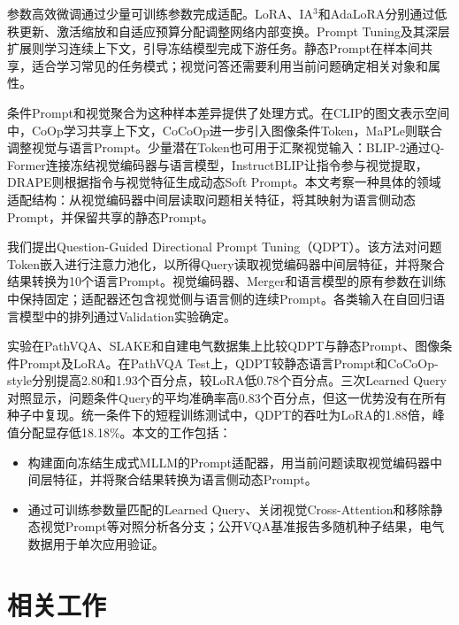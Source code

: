 \documentclass[pdflatex,sn-mathphys-num]{sn-jnl}
\begin{document}
参数高效微调通过少量可训练参数完成适配。LoRA、IA$^3$和AdaLoRA分别通过低秩更新、激活缩放和自适应预算分配调整网络内部变换\cite{Hu2022LoRA,Liu2022FewShotPF,Zhang2023AdaLoRAAB}。Prompt Tuning及其深层扩展则学习连续上下文，引导冻结模型完成下游任务\cite{li2021prefix,lester2021power,Liu2021PTuningVP,jia2022visual}。静态Prompt在样本间共享，适合学习常见的任务模式；视觉问答还需要利用当前问题确定相关对象和属性\cite{dai2023instructblip}。

条件Prompt和视觉聚合为这种样本差异提供了处理方式。在CLIP的图文表示空间中，CoOp学习共享上下文，CoCoOp进一步引入图像条件Token，MaPLe则联合调整视觉与语言Prompt\cite{Radford2021LearningTV,Zhou2021LearningTP,Zhou2022ConditionalPL,Khattak2022MaPLeMP}。少量潜在Token也可用于汇聚视觉输入\cite{Jaegle2021PerceiverGP,Ryoo2021TokenLearnerWC}：BLIP-2通过Q-Former连接冻结视觉编码器与语言模型，InstructBLIP让指令参与视觉提取，DRAPE则根据指令与视觉特征生成动态Soft Prompt\cite{li2023blip,dai2023instructblip,Hu2026DynamicCP}。本文考察一种具体的领域适配结构：从视觉编码器中间层读取问题相关特征，将其映射为语言侧动态Prompt，并保留共享的静态Prompt。

我们提出Question-Guided Directional Prompt Tuning（QDPT）。该方法对问题Token嵌入进行注意力池化，以所得Query读取视觉编码器中间层特征，并将聚合结果转换为10个语言Prompt。视觉编码器、Merger和语言模型的原有参数在训练中保持固定；适配器还包含视觉侧与语言侧的连续Prompt。各类输入在自回归语言模型中的排列通过Validation实验确定。

实验在PathVQA、SLAKE和自建电气数据集上比较QDPT与静态Prompt、图像条件Prompt及LoRA。在PathVQA Test上，QDPT较静态语言Prompt和CoCoOp-style分别提高2.80和1.93个百分点，较LoRA低0.78个百分点。三次Learned Query对照显示，问题条件Query的平均准确率高0.83个百分点，但这一优势没有在所有种子中复现。统一条件下的短程训练测试中，QDPT的吞吐为LoRA的1.88倍，峰值分配显存低18.18\%。本文的工作包括：

\begin{itemize}
    \item 构建面向冻结生成式MLLM的Prompt适配器，用当前问题读取视觉编码器中间层特征，并将聚合结果转换为语言侧动态Prompt。
    \item 通过可训练参数量匹配的Learned Query、关闭视觉Cross-Attention和移除静态视觉Prompt等对照分析各分支；公开VQA基准报告多随机种子结果，电气数据用于单次应用验证。
\end{itemize}
\section{相关工作}
\end{document}
